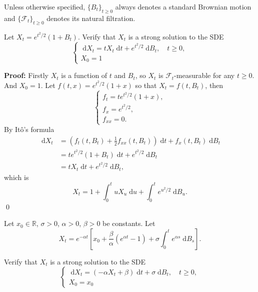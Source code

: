 \documentclass{MFM-hw} %
\date{Sep 28, 2026}
\newcommand{\filtration}{\mathcal{F}_t}
\newcommand{\dd}{\;\mathrm{d}}
\newcommand{\Ito}{It\^{o}}
\newcommand{\realset}{\mathbb{R}}
\begin{document}
\maketitle

Unless otherwise specified, $\{B_t\}_{t \ge 0}$ always denotes a standard Brownian motion and $\{ \filtration \}_{t \ge 0}$
denotes its natural filtration.

\HWproblem
Let $X_t = e^{t^2/2}(1+B_t)$. Verify that $X_t$ is a strong solution to the SDE
\[
\begin{cases}
    \dd X_t = tX_t\dd t + e^{t^2/2} \dd B_t,  \quad t\ge 0,\\
     X_0 = 1
\end{cases}
\]

\textbf{Proof: }Firstly $X_t$ is a function of $t$ and $B_t$, so $X_t$ is $\filtration$-measurable for any $t \ge 0$. And $X_0 = 1$. Let $f(t,x) = e^{t^2/2}(1+x)$ so that $X_t = f(t,B_t)$, then
\[
\begin{cases}
    f_t = te^{t^2/2}(1+x), \\
    f_x = e^{t^2/2}, \\
    f_{xx} = 0. 
\end{cases}
\]
By \Ito's formula
\begin{align*}
    \dd X_t &= (f_t(t,B_t) + \frac{1}{2} f_{xx}(t,B_t))\dd t + f_x(t,B_t) \dd B_t \\
    & = te^{t^2/2}(1+B_t) \dd t + e^{t^2/2} \dd B_t\\
    & = tX_t \dd t + e^{t^2/2} \dd B_t,
\end{align*}
which is
\[
    X_t = 1 + \int_0^{t} uX_u \dd u + \int_0^t e^{u^2/2} \dd B_u.
\]\qed

\HWproblem
Let $x_0 \in \realset$, $\sigma > 0$, $\alpha > 0$, $\beta > 0$ be constants. Let
\[
    X_t = e^{-\alpha t} \left[ x_0 + \frac{\beta}{\alpha}(e^{\alpha t}-1)+\sigma \int_0^t e^{\alpha s} \dd B_s \right].
\]

\HWsubproblem
Verify that $X_t$ is a strong solution to the SDE
\[
\begin{cases}
    \dd X_t = (-\alpha X_t + \beta)\dd t + \sigma \dd B_t,  \quad t\ge 0,\\
     X_0 = x_0
\end{cases}
\]
\end{document}
